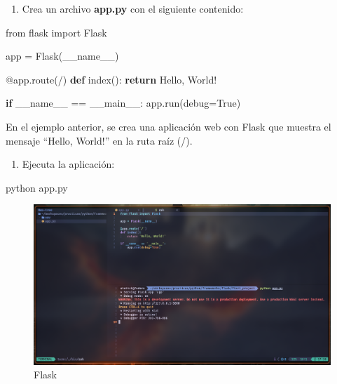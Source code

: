 \documentclass[
  a4paper,
  DIV=11,
  numbers=noendperiod,
  onepage,
  openany]{scrreprt}
\newenvironment{Shaded}{\begin{snugshade}}{\end{snugshade}}
\newcommand{\AttributeTok}[1]{\textcolor[rgb]{0.40,0.45,0.13}{#1}}
\newcommand{\ControlFlowTok}[1]{\textcolor[rgb]{0.00,0.23,0.31}{\textbf{#1}}}
\newcommand{\ExtensionTok}[1]{\textcolor[rgb]{0.00,0.23,0.31}{#1}}
\newcommand{\ImportTok}[1]{\textcolor[rgb]{0.00,0.46,0.62}{#1}}
\newcommand{\KeywordTok}[1]{\textcolor[rgb]{0.00,0.23,0.31}{\textbf{#1}}}
\newcommand{\NormalTok}[1]{\textcolor[rgb]{0.00,0.23,0.31}{#1}}
\newcommand{\OperatorTok}[1]{\textcolor[rgb]{0.37,0.37,0.37}{#1}}
\newcommand{\StringTok}[1]{\textcolor[rgb]{0.13,0.47,0.30}{#1}}
\newcommand{\VariableTok}[1]{\textcolor[rgb]{0.07,0.07,0.07}{#1}}
\providecommand{\tightlist}{%
  \setlength{\itemsep}{0pt}\setlength{\parskip}{0pt}}\usepackage{longtable,booktabs,array}
\begin{document}
\begin{enumerate}
\def\labelenumi{\arabic{enumi}.}
\setcounter{enumi}{1}
\tightlist
\item
  Crea un archivo \textbf{app.py} con el siguiente contenido:
\end{enumerate}

\begin{Shaded}
\begin{Highlighting}[]
\ImportTok{from}\NormalTok{ flask }\ImportTok{import}\NormalTok{ Flask}

\NormalTok{app }\OperatorTok{=}\NormalTok{ Flask(}\VariableTok{\_\_name\_\_}\NormalTok{)}

\AttributeTok{@app.route}\NormalTok{(}\StringTok{\textquotesingle{}/\textquotesingle{}}\NormalTok{)}
\KeywordTok{def}\NormalTok{ index():}
    \ControlFlowTok{return} \StringTok{\textquotesingle{}Hello, World!\textquotesingle{}}

\ControlFlowTok{if} \VariableTok{\_\_name\_\_} \OperatorTok{==} \StringTok{\textquotesingle{}\_\_main\_\_\textquotesingle{}}\NormalTok{:}
\NormalTok{    app.run(debug}\OperatorTok{=}\VariableTok{True}\NormalTok{)}
\end{Highlighting}
\end{Shaded}

En el ejemplo anterior, se crea una aplicación web con Flask que muestra
el mensaje ``Hello, World!'' en la ruta raíz (/).

\begin{enumerate}
\def\labelenumi{\arabic{enumi}.}
\setcounter{enumi}{2}
\tightlist
\item
  Ejecuta la aplicación:
\end{enumerate}

\begin{Shaded}
\begin{Highlighting}[]
\ExtensionTok{python}\NormalTok{ app.py}
\end{Highlighting}
\end{Shaded}

\begin{figure}[H]

{\centering \includegraphics[width=8.33333in,height=\textheight,keepaspectratio]{unidades/unidad7/./images/flask_code001.png}

}

\caption{Flask}

\end{figure}%
\end{document}
